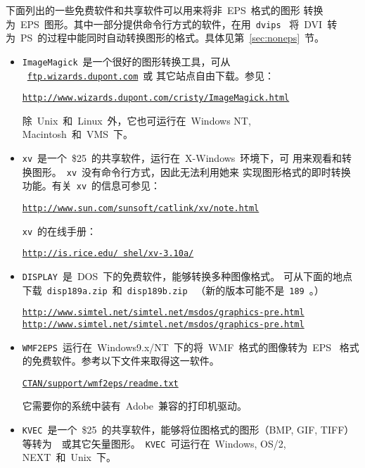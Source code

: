 下面列出的一些免费软件和共享软件可以用来将非~EPS~格式的图形
转换为~EPS~图形。其中一部分提供命令行方式的软件，在用~\texttt{dvips}~
将~DVI~转为~PS~的过程中能同时自动转换图形的格式。具体见第~\ref{sec:noneps}~节。

\begin{itemize}
	\item \texttt{ImageMagick}~是一个很好的图形转换工具，可从
	~\href{ftp://ftp.wizards.dupont.com}{\texttt{ftp.wizards.dupont.com}}~或
	其它站点自由下载。参见：
	
	\href{http://www.wizards.dupont.com/cristy/ImageMagick.html}%
	{\texttt{http://www.wizards.dupont.com/cristy/ImageMagick.html}}
	
	除~Unix~和~Linux~外，它也可运行在~Windows NT, Macintosh~和~VMS~下。
	
	\item \texttt{xv}~是一个~\$25~的共享软件，运行在~X-Windows~环境下，可
	用来观看和转换图形。~\texttt{xv}~没有命令行方式，因此无法利用她来
	实现图形格式的即时转换功能。有关~\texttt{xv}~的信息可参见：
	
	\href{http://www.sun.com/sunsoft/catlink/xv/note.html}%
	{\texttt{http://www.sun.com/sunsoft/catlink/xv/note.html}}
	
	\texttt{xv}~的在线手册：
	
	\href{http://is.rice.edu/~shel/xv-3.10a/}{\texttt{http://is.rice.edu/~shel/xv-3.10a/}}
	
	\item \texttt{DISPLAY}~是~DOS~下的免费软件，能够转换多种图像格式。
	可从下面的地点下载~\texttt{disp189a.zip}~和~\texttt{disp189b.zip}~
	（新的版本可能不是~\texttt{189}~。）
	
	\href{http://www.simtel.net/simtel.net/msdos/graphics-pre.html}%
	{\texttt{http://www.simtel.net/simtel.net/msdos/graphics-pre.html}} \\
	\href{http://www.simtel.net/simtel.net/msdos/graphics-pre.html}%
	{\texttt{http://www.simtel.net/simtel.net/msdos/graphics-pre.html}}
	
	\item \texttt{WMF2EPS}~运行在~Windows9.x/NT~下的将~WMF~格式的图像转为~EPS~
	格式的免费软件。参考以下文件来取得这一软件。
	
	\href{ftp://ftp.tug.org/tex-archive/support/wmf2eps/readme.txt}%
	{\texttt{CTAN/support/wmf2eps/readme.txt}}
	
	它需要你的系统中装有~Adobe~兼容的打印机驱动。
	
	\item \texttt{KVEC}~是一个~\$25~的共享软件，能够将位图格式的图形（BMP, GIF,
	TIFF）等转为~\PS~或其它矢量图形。~\texttt{KVEC}~可运行在~Windows, OS/2,
	NEXT~和~Unix~下。
	

\end{itemize}
